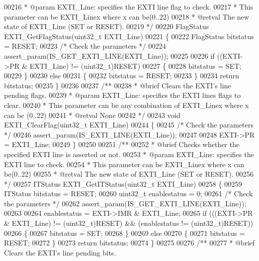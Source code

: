 \begin{DoxyCode}
00216 \textcolor{comment}{  * @param  EXTI\_Line: specifies the EXTI line flag to check.}
00217 \textcolor{comment}{  *          This parameter can be EXTI\_Linex where x can be(0..22)}
00218 \textcolor{comment}{  * @retval The new state of EXTI\_Line (SET or RESET).}
00219 \textcolor{comment}{  */}
00220 FlagStatus EXTI_GetFlagStatus(uint32\_t EXTI\_Line)
00221 \{
00222   FlagStatus bitstatus = RESET;
00223   \textcolor{comment}{/* Check the parameters */}
00224   assert_param(IS\_GET\_EXTI\_LINE(EXTI\_Line));
00225 
00226   \textcolor{keywordflow}{if} ((EXTI->PR & EXTI\_Line) != (uint32\_t)RESET)
00227   \{
00228     bitstatus = SET;
00229   \}
00230   \textcolor{keywordflow}{else}
00231   \{
00232     bitstatus = RESET;
00233   \}
00234   \textcolor{keywordflow}{return} bitstatus;
00235 \}
00236 
00237 \textcolor{comment}{/**}
00238 \textcolor{comment}{  * @brief  Clears the EXTI's line pending flags.}
00239 \textcolor{comment}{  * @param  EXTI\_Line: specifies the EXTI lines flags to clear.}
00240 \textcolor{comment}{  *          This parameter can be any combination of EXTI\_Linex where x can be (0..22)}
00241 \textcolor{comment}{  * @retval None}
00242 \textcolor{comment}{  */}
00243 \textcolor{keywordtype}{void} EXTI_ClearFlag(uint32\_t EXTI\_Line)
00244 \{
00245   \textcolor{comment}{/* Check the parameters */}
00246   assert_param(IS\_EXTI\_LINE(EXTI\_Line));
00247 
00248   EXTI->PR = EXTI\_Line;
00249 \}
00250 
00251 \textcolor{comment}{/**}
00252 \textcolor{comment}{  * @brief  Checks whether the specified EXTI line is asserted or not.}
00253 \textcolor{comment}{  * @param  EXTI\_Line: specifies the EXTI line to check.}
00254 \textcolor{comment}{  *          This parameter can be EXTI\_Linex where x can be(0..22)}
00255 \textcolor{comment}{  * @retval The new state of EXTI\_Line (SET or RESET).}
00256 \textcolor{comment}{  */}
00257 ITStatus EXTI_GetITStatus(uint32\_t EXTI\_Line)
00258 \{
00259   ITStatus bitstatus = RESET;
00260   uint32\_t enablestatus = 0;
00261   \textcolor{comment}{/* Check the parameters */}
00262   assert_param(IS\_GET\_EXTI\_LINE(EXTI\_Line));
00263 
00264   enablestatus =  EXTI->IMR & EXTI\_Line;
00265   \textcolor{keywordflow}{if} (((EXTI->PR & EXTI\_Line) != (uint32\_t)RESET) && (enablestatus != (uint32\_t)RESET))
00266   \{
00267     bitstatus = SET;
00268   \}
00269   \textcolor{keywordflow}{else}
00270   \{
00271     bitstatus = RESET;
00272   \}
00273   \textcolor{keywordflow}{return} bitstatus;
00274 \}
00275 
00276 \textcolor{comment}{/**}
00277 \textcolor{comment}{  * @brief  Clears the EXTI's line pending bits.}

\end{DoxyCode}

